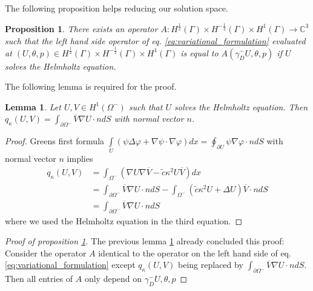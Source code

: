 \documentclass[10pt,journal,compsoc, onecolumn]{IEEEtran}
\newtheorem{lemma}[theorem]{Lemma}
\newtheorem{proposition}[theorem]{Proposition}
\begin{document}
The following proposition helps reducing our solution space.
\begin{proposition}
    \label{prop:reduced_operator}
    There exists an operator 
    $A: H^{\frac{1}{2}}(\Gamma) \times H^{-\frac{1}{2}}(\Gamma) \times H^{1}(\Gamma)
    \rightarrow \mathbb{C}^3$ such that 
    the left hand side operator of eq. \ref{eq:variational_formulation} evaluated at $(U, \theta, p) \in H^{\frac{1}{2}}(\Gamma) \times H^{-\frac{1}{2}}(\Gamma) \times H^{1}(\Gamma)$ 
    is equal to $A(\gamma_D^- U, \theta, p)$ if $U$ solves the Helmholtz equation. 
\end{proposition}
The following lemma is required for the proof.
\begin{lemma}\label{lem:reduced_q}
    Let $U, V \in H^{1}(\Omega^-)$ such that $U$ solves the Helmholtz equation. 
    Then $q_\kappa(U, V) = \int_{ \partial \Omega^-} \overline{V} \nabla U  \cdot nd {S}$ with normal vector $n$.
\end{lemma}
\begin{proof}
    Greens first formula 
    \(\int\limits_{U}(\psi \Delta \varphi+\nabla \psi \cdot \nabla \varphi) dx=
    \oint_{\partial U} \psi \nabla \varphi \cdot n dS\) with normal vector $n$
    implies 
\begin{align}
    q_\kappa(U, V) &= \int_{\Omega^-} ( \nabla U \nabla \overline{V} -  \tilde c\kappa^2U \overline{V})dx \nonumber \\
    &= \int_{ \partial \Omega^-} \overline{V} \nabla U \cdot nd {S} - \int_{\Omega^{-}} {( \tilde c\kappa^2 U + \Delta U)}\overline{V} \cdot nd{S}  \nonumber  \\
    &= \int_{ \partial \Omega^-} \overline{V} \nabla U \cdot nd {S} \nonumber
\end{align}
    where we used the Helmholtz equation in the third equation.
\end{proof}
\begin{proof}[Proof of proposition \ref{prop:reduced_operator}]
    The previous lemma \ref{lem:reduced_q} already concluded this proof: 
    Consider the operator $A$ identical to the operator on the left hand side of eq. \ref{eq:variational_formulation}
    except $q_\kappa(U, V)$ being replaced by 
    $\int_{ \partial \Omega^-} \overline{V} \nabla U  \cdot nd {S}$.
    Then all entries of $A$ only depend on $\gamma_D^- U, \theta, p$
\end{proof}
\end{document}

